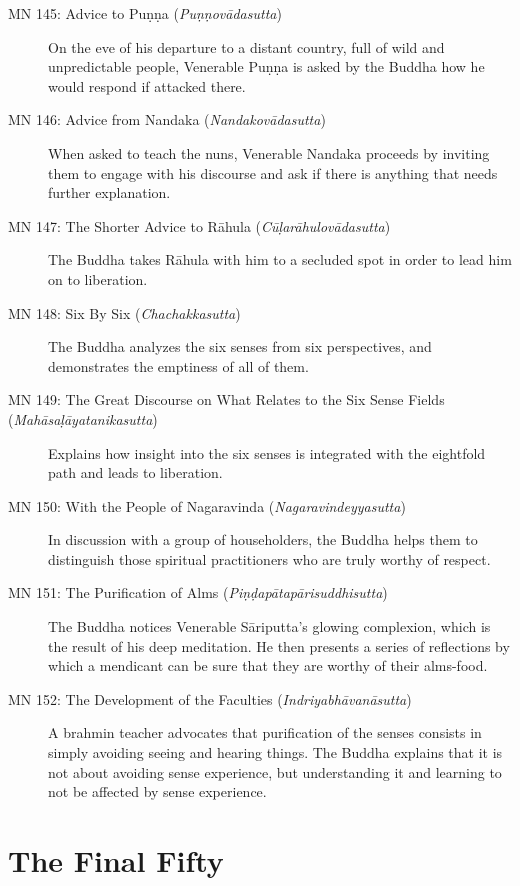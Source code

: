 \documentclass[12pt,openany]{book}%
\let\oldcontentsline\contentsline
\newcommand{\nopagecontentsline}[3]{\oldcontentsline{#1}{#2}{}}
\let\oldmainmatter\mainmatter
\renewcommand{\mainmatter}{%
\chapterfont{\thispagestyle{empty}\vspace*{4em}\setstretch{.85}\LARGE\normalfont\itshape\scshape\centering\MakeLowercase}
\sectionfont{\clearpage\thispagestyle{plain}\vspace*{2em}\setstretch{.85}\normalfont\centering}%
\oldmainmatter}
\begin{document}
\begin{description}
\item[MN 145: Advice to \textsanskrit{Puṇṇa} (\textit{\textsanskrit{Puṇṇovādasutta}})] On the eve of his departure to a distant country, full of wild and unpredictable people, Venerable \textsanskrit{Puṇṇa} is asked by the Buddha how he would respond if attacked there.%
\item[MN 146: Advice from Nandaka (\textit{\textsanskrit{Nandakovādasutta}})] When asked to teach the nuns, Venerable Nandaka proceeds by inviting them to engage with his discourse and ask if there is anything that needs further explanation.%
\item[MN 147: The Shorter Advice to \textsanskrit{Rāhula} (\textit{\textsanskrit{Cūḷarāhulovādasutta}})] The Buddha takes \textsanskrit{Rāhula} with him to a secluded spot in order to lead him on to liberation.%
\item[MN 148: Six By Six (\textit{\textsanskrit{Chachakkasutta}})] The Buddha analyzes the six senses from six perspectives, and demonstrates the emptiness of all of them.%
\item[MN 149: The Great Discourse on What Relates to the Six Sense Fields (\textit{\textsanskrit{Mahāsaḷāyatanikasutta}})] Explains how insight into the six senses is integrated with the eightfold path and leads to liberation.%
\item[MN 150: With the People of Nagaravinda (\textit{\textsanskrit{Nagaravindeyyasutta}})] In discussion with a group of householders, the Buddha helps them to distinguish those spiritual practitioners who are truly worthy of respect.%
\item[MN 151: The Purification of Alms (\textit{\textsanskrit{Piṇḍapātapārisuddhisutta}})] The Buddha notices Venerable \textsanskrit{Sāriputta}’s glowing complexion, which is the result of his deep meditation. He then presents a series of reflections by which a mendicant can be sure that they are worthy of their alms-food.%
\item[MN 152: The Development of the Faculties (\textit{\textsanskrit{Indriyabhāvanāsutta}})] A brahmin teacher advocates that purification of the senses consists in simply avoiding seeing and hearing things. The Buddha explains that it is not about avoiding sense experience, but understanding it and learning to not be affected by sense experience.%
\end{description}

%
\mainmatter%
\pagestyle{fancy}%
\part*{The Final Fifty }
\markboth{}{}
\addtocontents{toc}{\let\protect\contentsline\protect\oldcontentsline}
\end{document}
